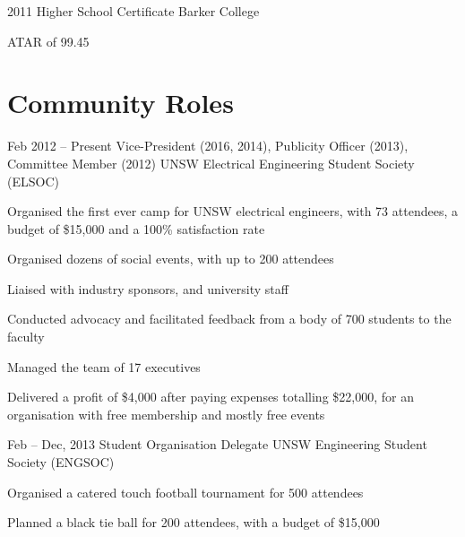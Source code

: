\documentclass[a4paper]{friggeri-cv} %
\newcommand\shortdot[1]{
\vspace{-\parsep}
\vspace{-1em}
\begin{itemize*}
#1
\end{itemize*} 
}
\begin{document}

\entry
{2011}
{Higher School Certificate}
{Barker College}
{
\shortdot{
   \item ATAR of 99.45
}
%
}




\newpage{}

\section{Community Roles}




\entry
{Feb 2012 -- Present}
{Vice-President (2016, 2014), Publicity Officer (2013), Committee Member (2012)}
{UNSW Electrical Engineering Student Society (ELSOC)}
{\vspace{-1em}\vspace{-\parsep}
\begin{itemize*}
   \item Organised the first ever camp for UNSW electrical engineers, with 73 attendees, a budget of \$15,000 and a 100\% satisfaction rate
   \item Organised dozens of social events, with up to 200 attendees
   \item Liaised with industry sponsors, and university staff
   \item Conducted advocacy and facilitated feedback from a body of 700 students to the faculty
   \item Managed the team of 17 executives
   \item Delivered a profit of \$4,000 after paying expenses totalling \$22,000, for an organisation with free membership and mostly free events
\end{itemize*}
}



\entry
{Feb -- Dec, 2013}
{Student Organisation Delegate}
{UNSW Engineering Student Society (ENGSOC)}
{
\shortdot{
   \item Organised a catered touch football tournament for 500 attendees
   \item Planned a black tie ball for 200 attendees, with a budget of \$15,000
}
}
\end{document}
